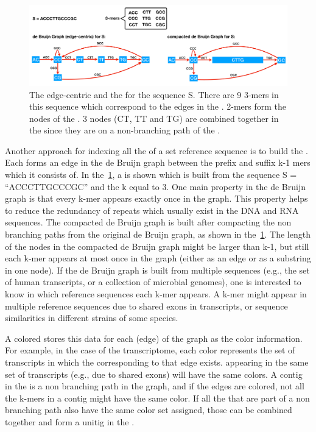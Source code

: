 \begin{figure}
 \centering
 \includegraphics[width=0.95\columnwidth]{Figures/intro/deBruijnGraph.pdf}
 \caption[The edge-centric \dbg]{The edge-centric \dbg and the \cdbg for the 
 sequence S. There are 9 3-mers in this sequence which correspond to the edges 
 in the \dbg. 2-mers form the nodes of the \dbg. 3 nodes (CT, TT and TG) are 
 combined together in the \cdbg since they are on a non-branching path of the 
 \dbg.}
  \label{fig:dbg}
\end{figure}

Another approach for indexing all the \kmers of a set reference sequence is to 
build the \dbg. Each \kmer forms an edge in the de Bruijn graph between the 
prefix and suffix k-1 mers which it consists of. In the~\cref{fig:dbg}, a \dbg 
is shown which is built from the sequence S = “ACCCTTGCCCGC” and the k 
equal to 3. One main property in the de Bruijn graph is that every k-mer 
appears exactly once in the graph. This property helps to reduce the redundancy 
of repeats which usually exist in the DNA and RNA sequences. The compacted 
de Bruijn graph is built after compacting the non branching paths from the 
original de Bruijn graph, as shown in the~\cref{fig:dbg}. The length of the 
nodes in the compacted de Bruijn graph might be larger than k-1, but still 
each k-mer appears at most once in the graph (either as an edge or as a 
substring in one node). If the de Bruijn graph is built from multiple 
sequences (e.g., the set of human transcripts, or a collection of microbial 
genomes), one is interested to know in which reference sequences each k-mer 
appears. A k-mer might appear in multiple reference sequences due to shared 
exons in transcripts, or sequence similarities in different strains of some 
species.

A colored \dbg stores this data for each \kmer (edge) of the graph as the color 
information. For example, in the case of the transcriptome, each color represents 
the set of transcripts in which the \kmer corresponding to that edge exists. 
\Kmers appearing in the same set of transcripts (e.g., due to shared exons) 
will have the same colors. A contig in the \cdbg is a non branching path in 
the graph, and if the edges are colored, not all the k-mers in a contig might 
have the same color.
If all the \kmers that are part of a non branching path also have the same color 
set assigned, those \kmers can be combined together and form a unitig in the 
\ccdbg.

